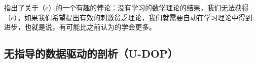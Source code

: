 
 \citet[]{PS2002a}指出了关于（c）的一个有趣的悖论：没有学习的数学理论的结果，我们无法获得（c）。如果我们希望提出有效的刺激贫乏理论，我们就需要自动在学习理论中得到进步，也就是说，有可能比之前认为的学会更多。

\subsection{无指导的数据驱动的剖析（U-DOP）}
\label{Abschnitt-UDOP}

